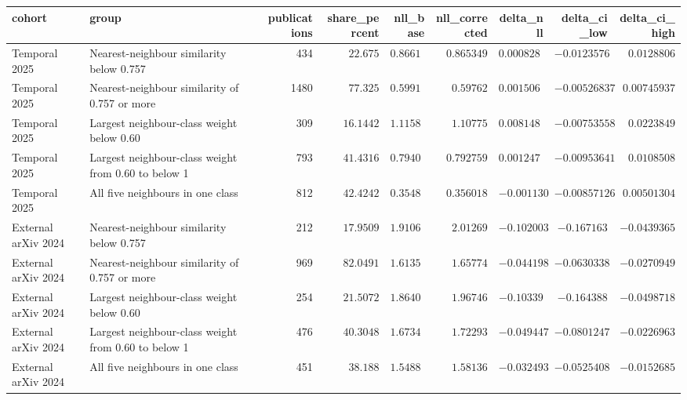 \begin{tabular}{llrrrrrrr}
\toprule
cohort & group & publications & share\_percent & nll\_base & nll\_corrected & delta\_nll & delta\_ci\_low & delta\_ci\_high \\
\midrule
Temporal 2025 & Nearest-neighbour similarity below 0.757 & 434 & $22.675$ & $0.866177$ & $0.865349$ & $0.000828299$ & $-0.0123576$ & $0.0128806$ \\
Temporal 2025 & Nearest-neighbour similarity of 0.757 or more & 1480 & $77.325$ & $0.599126$ & $0.59762$ & $0.00150634$ & $-0.00526837$ & $0.00745937$ \\
Temporal 2025 & Largest neighbour-class weight below 0.60 & 309 & $16.1442$ & $1.11589$ & $1.10775$ & $0.00814831$ & $-0.00753558$ & $0.0223849$ \\
Temporal 2025 & Largest neighbour-class weight from 0.60 to below 1 & 793 & $41.4316$ & $0.794007$ & $0.792759$ & $0.0012476$ & $-0.00953641$ & $0.0108508$ \\
Temporal 2025 & All five neighbours in one class & 812 & $42.4242$ & $0.354887$ & $0.356018$ & $-0.00113092$ & $-0.00857126$ & $0.00501304$ \\
External arXiv 2024 & Nearest-neighbour similarity below 0.757 & 212 & $17.9509$ & $1.91069$ & $2.01269$ & $-0.102003$ & $-0.167163$ & $-0.0439365$ \\
External arXiv 2024 & Nearest-neighbour similarity of 0.757 or more & 969 & $82.0491$ & $1.61354$ & $1.65774$ & $-0.0441981$ & $-0.0630338$ & $-0.0270949$ \\
External arXiv 2024 & Largest neighbour-class weight below 0.60 & 254 & $21.5072$ & $1.86407$ & $1.96746$ & $-0.10339$ & $-0.164388$ & $-0.0498718$ \\
External arXiv 2024 & Largest neighbour-class weight from 0.60 to below 1 & 476 & $40.3048$ & $1.67349$ & $1.72293$ & $-0.0494478$ & $-0.0801247$ & $-0.0226963$ \\
External arXiv 2024 & All five neighbours in one class & 451 & $38.188$ & $1.54886$ & $1.58136$ & $-0.0324933$ & $-0.0525408$ & $-0.0152685$ \\
\bottomrule
\end{tabular}
